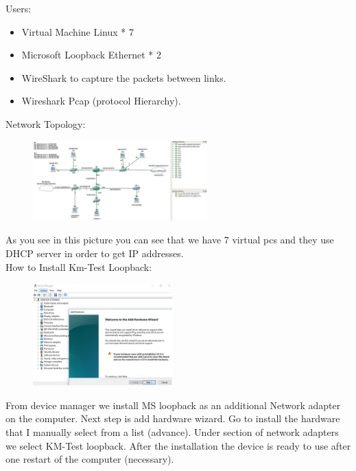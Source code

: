 \documentclass{article}
\begin{document}
Users:

\begin{itemize}
	\item Virtual Machine Linux * 7
	\item Microsoft Loopback Ethernet * 2
	\item WireShark to capture the packets between links. 
	\item Wireshark Pcap (protocol Hierarchy).
\end{itemize}





Network Topology:

\begin{figure}[H]
	\begin{center}
		\includegraphics[width=0.6\textwidth]{Topology.jpg}
	\end{center}
	\caption{\small  \newline}
	\label{fig:Prd}
\end{figure}

As you see in this picture you can see that we have 7 virtual pcs and they use DHCP server in order to get IP addresses.\\
How to Install Km-Test Loopback: 

\begin{figure}[H]
	\centering
		\includegraphics[width=0.48\textwidth]{LoopBackIns1.jpg}
	
	\caption{\small  \newline}
	\label{fig:Prd}
\end{figure}

From device manager we install MS loopback as an additional Network adapter on the computer. Next step is add hardware wizard. Go to install the hardware that I manually select from a list (advance). Under section of network adapters we select KM-Test loopback. After the installation the device is ready to use after one restart of the computer (necessary).
\end{document}
